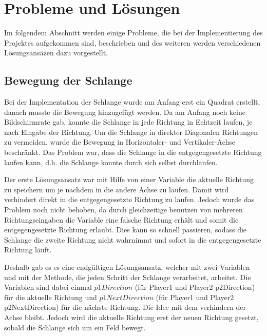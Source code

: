 
\chapter{Probleme und L{\"o}sungen}
\label{Probleme_und_Loesungen}
%
Im folgendem Abschnitt werden einige Probleme, die bei der Implementierung des Projektes aufgekommen sind, beschrieben und des weiteren werden verschiedenen L{\"o}sungsans{\"a}zen dazu vorgestellt.

\section{Bewegung der Schlange}
\label{Bewegung der Schlange}
%
Bei der Implementation der Schlange wurde am Anfang erst ein Quadrat erstellt, danach musste die Bewegung hinzugef{\"u}gt werden. Da am Anfang noch keine Bildschirmrate gab, konnte die Schlange in jede Richtung in Echtzeit laufen, je nach Eingabe der Richtung. Um die Schlange in direkter Diagonalen Richtungen zu vermeiden, wurde die Bewegung in Horizontaler- und Vertikaler-Achse beschr{\"a}nkt. Das Problem war, dass die Schlange in die entgegengesetzte Richtung laufen kann, d.h. die Schlange konnte durch sich selbst durchlaufen.

Der erste L{\"o}sungsansatz war mit Hilfe von einer Variable die aktuelle Richtung zu speichern um je nachdem in die andere Achse zu laufen. Damit wird verhindert direkt in die entgegengesetzte Richtung zu laufen. Jedoch wurde das Problem noch nicht behoben, da durch gleichzeitige benutzen von mehreren Richtungseingaben die Variable eine falsche Richtung erh{\"a}lt und somit die entgegengesetzte Richtung erlaubt. Dies kann so schnell passieren, sodass die Schlange die zweite Richtung nicht wahrnimmt und sofort in die entgegengesetzte Richtung l{\"a}uft.

Deshalb gab es es eine endg{\"u}ltigen L{\"o}sungsansatz, welcher mit zwei Variablen und mit der Methode, die jeden Schritt der Schlange verarbeitet, arbeitet. Die Variablen sind dabei einmal $p1Direction$ (f{\"u}r Player1 und Player2 p2Direction) f{\"u}r die aktuelle Richtung und $p1NextDirection$ (f{\"u}r Player1 und Player2 p2NextDirection) f{\"u}r die n{\"a}chste Richtung. Die Idee mit dem verhindern der Achse bleibt. Jedoch wird die aktuelle Richtung erst der neuen Richtung gesetzt, sobald die Schlange sich um ein Feld bewegt. 
%

